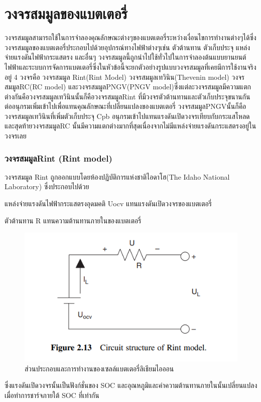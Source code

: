 \section{วงจรสมมูลของแบตเตอรี่}
	วงจรสมมูลสามารถใช้ในการจำลองคุณลักษณะต่างๆของแบตเตอรี่ระหว่างเงื่อนไขการทำงานต่างๆได้ซึ่งวงจรสมมูลของแบตเตอรี่ประกอบไปด้วยอุปกรณ์ทางไฟฟ้าต่างๆเช่น ตัวต้านทาน ตัวเก็บประจุ แหล่งจ่ายแรงดันไฟฟ้ากระแสตรง และอื่นๆ วงจรสมมูลนี้ถูกนำไปใช้ทั่วไปในการจำลองต้นแบบยานยนต์ไฟฟ้าและระบบการจัดการแบตเตอรี่ซึ่งในหัวข้อนี้จะยกตัวอย่างรูปแบบวงจรสมมูลที่เคยมีการใช้งานจริงอยู่ 4 วงจรคือ วงจรสมมูล Rint(Rint Model) วงจรสมมูลเทวินิน(Thevenin model) วงจรสมมูลRC(RC model) และวงจรสมมูลPNGV(PNGV model)ซึ่งแต่ละวงจรสมมูลมีความแตกต่างกันคือวงจรสมมูลเทวินินนั้นก็คือวงจรสมมูลRint ที่มีวงจรตัวต้านทานและตัวเก็บประจุขนานกันต่ออนุกรมเพิ่มเข้าไปเพื่อแทนคุณลักษณะที่เปลี่ยนแปลงของแบตเตอรี่ วงจรสมมูลPNGVนั้นก็คือวงจรสมมูลเทวินินที่เพิ่มตัวเก็บประจุ Cpb อนุกรมเข้าไปแทนแรงดันเปิดวงจรเทียบกับกระแสโหลด และสุดท้ายวงจรสมมูลRC นั้นมีความแตกต่างมากที่สุดเนื่องจากไม่มีแหล่งจ่ายแรงดันกระแสตรงอยู่ในวงจรเลย\newline
\subsubsection*{วงจรสมมูลRint (Rint model)}
วงจรสมมูล Rint ถูกออกแบบโดยห้องปฏิบัติการแห่งชาติไอดาโฮ(The Idaho National Laboratory) ซึ่งประกอบไปด้วย
\begin{itemize}
{\item แหล่งจ่ายแรงดันไฟฟ้ากระแสตรงอุดมคติ Uocv แทนแรงดันเปิดวงจรของแบตเตอรี่}
{\item ตัวต้านทาน R แทนความต้านทานภายในของแบตเตอรี่}
\end{itemize}
\begin{center}
	\begin{figure}[!h]
		\includegraphics[width=0.6\linewidth]{Chapters/img/Rint_model.png}
			\centering
			\captionsetup{justification=centering,margin=2cm}
			\caption{ส่วนประกอบและการทำงานของเซลล์แบตเตอรี่ลิเธียมไอออน}
	\end{figure}
\end{center}
ซึ่งแรงดันเปิดวงจรนั้นเป็นฟังก์ชั่นของ SOC และอุณหภูมิและค่าความต้านทานภายในนั้นเปลี่ยนแปลงเมื่อทำการชาร์จภายใต้ SOC ที่เท่ากัน\newline
